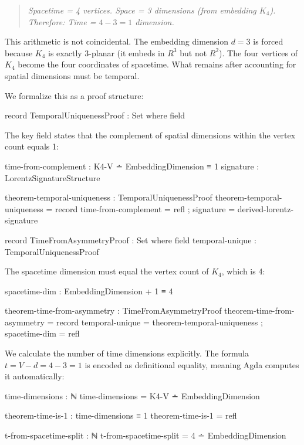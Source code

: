 \documentclass[11pt,a4paper]{book}
\def\mathbb#1{#1}%
\begin{document}
\begin{quote}
\emph{Spacetime = 4 vertices. Space = 3 dimensions (from embedding $K_4$).\\
Therefore: Time = $4 - 3 = 1$ dimension.}
\end{quote}

This arithmetic is not coincidental. The embedding dimension $d = 3$ is forced because $K_4$ 
is exactly 3-planar (it embeds in $\mathbb{R}^3$ but not $\mathbb{R}^2$). The four vertices 
of $K_4$ become the four coordinates of spacetime. What remains after accounting for spatial 
dimensions must be temporal.

We formalize this as a proof structure:

\begin{code}
record TemporalUniquenessProof : Set where
  field
\end{code}

The key field states that the complement of spatial dimensions within the vertex count equals 1:

\begin{code}
    time-from-complement : K4-V ∸ EmbeddingDimension ≡ 1
    signature : LorentzSignatureStructure
    
theorem-temporal-uniqueness : TemporalUniquenessProof
theorem-temporal-uniqueness = record 
  { time-from-complement = refl
  ; signature = derived-lorentz-signature
  }

record TimeFromAsymmetryProof : Set where
  field
    temporal-unique : TemporalUniquenessProof
\end{code}

The spacetime dimension must equal the vertex count of $K_4$, which is 4:

\begin{code}
    spacetime-dim : EmbeddingDimension + 1 ≡ 4

theorem-time-from-asymmetry : TimeFromAsymmetryProof
theorem-time-from-asymmetry = record
  { temporal-unique = theorem-temporal-uniqueness
  ; spacetime-dim = refl
  }
\end{code}

We calculate the number of time dimensions explicitly. The formula $t = V - d = 4 - 3 = 1$ 
is encoded as definitional equality, meaning Agda computes it automatically:

\begin{code}
time-dimensions : ℕ
time-dimensions = K4-V ∸ EmbeddingDimension

theorem-time-is-1 : time-dimensions ≡ 1
theorem-time-is-1 = refl

t-from-spacetime-split : ℕ
t-from-spacetime-split = 4 ∸ EmbeddingDimension
\end{code}
\end{document}
